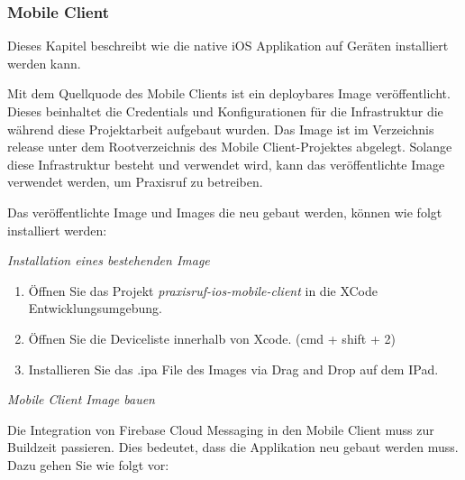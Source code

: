 \clearpage

\subsubsection*{Mobile Client}

Dieses Kapitel beschreibt wie die native iOS Applikation auf Geräten installiert werden kann.

Mit dem Quellquode des Mobile Clients ist ein deploybares Image veröffentlicht.
Dieses beinhaltet die Credentials und Konfigurationen für die Infrastruktur die während diese Projektarbeit aufgebaut wurden.
Das Image ist im Verzeichnis release unter dem Rootverzeichnis des Mobile Client-Projektes abgelegt.
Solange diese Infrastruktur besteht und verwendet wird, kann das veröffentlichte Image verwendet werden, um Praxisruf zu betreiben.

Das veröffentlichte Image und Images die neu gebaut werden, können wie folgt installiert werden:

\textit{Installation eines bestehenden Image}

\begin{enumerate}
    \item Öffnen Sie das Projekt \textit{praxisruf-ios-mobile-client} in die XCode Entwicklungsumgebung.
    \item Öffnen Sie die Deviceliste innerhalb von Xcode. (cmd + shift + 2)
    \item Installieren Sie das .ipa File des Images via Drag and Drop auf dem IPad.
\end{enumerate}

\textit{Mobile Client Image bauen}

Die Integration von Firebase Cloud Messaging in den Mobile Client muss zur Buildzeit passieren.
Dies bedeutet, dass die Applikation neu gebaut werden muss.
Dazu gehen Sie wie folgt vor:

